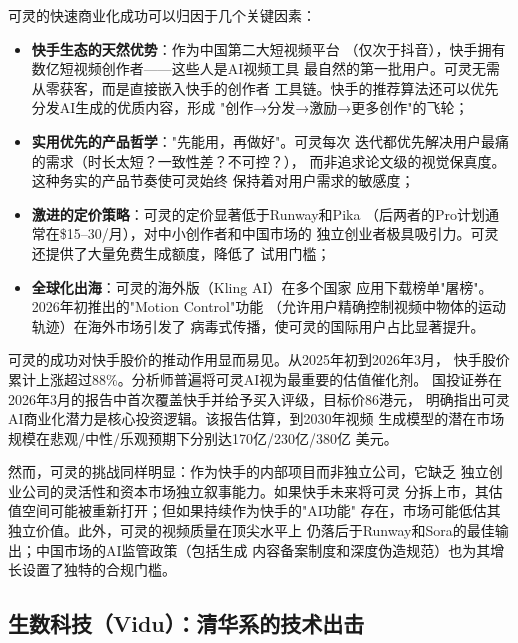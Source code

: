 \begin{whybox}[可灵为什么能在商业化上跑赢Sora和Runway？]
可灵的快速商业化成功可以归因于几个关键因素：
\begin{itemize}
  \item \textbf{快手生态的天然优势}：作为中国第二大短视频平台
    （仅次于抖音），快手拥有数亿短视频创作者——这些人是AI视频工具
    最自然的第一批用户。可灵无需从零获客，而是直接嵌入快手的创作者
    工具链。快手的推荐算法还可以优先分发AI生成的优质内容，形成
    "创作→分发→激励→更多创作"的飞轮；
  \item \textbf{实用优先的产品哲学}："先能用，再做好"。可灵每次
    迭代都优先解决用户最痛的需求（时长太短？一致性差？不可控？），
    而非追求论文级的视觉保真度。这种务实的产品节奏使可灵始终
    保持着对用户需求的敏感度；
  \item \textbf{激进的定价策略}：可灵的定价显著低于Runway和Pika
    （后两者的Pro计划通常在\$15--30/月），对中小创作者和中国市场的
    独立创业者极具吸引力。可灵还提供了大量免费生成额度，降低了
    试用门槛；
  \item \textbf{全球化出海}：可灵的海外版（Kling AI）在多个国家
    应用下载榜单"屠榜"。2026年初推出的"Motion Control"功能
    （允许用户精确控制视频中物体的运动轨迹）在海外市场引发了
    病毒式传播，使可灵的国际用户占比显著提升。
\end{itemize}
\end{whybox}

可灵的成功对快手股价的推动作用显而易见。从2025年初到2026年3月，
快手股价累计上涨超过88\%。分析师普遍将可灵AI视为最重要的估值催化剂。
国投证券在2026年3月的报告中首次覆盖快手并给予买入评级，目标价86港元，
明确指出可灵AI商业化潜力是核心投资逻辑。该报告估算，到2030年视频
生成模型的潜在市场规模在悲观/中性/乐观预期下分别达170亿/230亿/380亿
美元。

然而，可灵的挑战同样明显：作为快手的内部项目而非独立公司，它缺乏
独立创业公司的灵活性和资本市场独立叙事能力。如果快手未来将可灵
分拆上市，其估值空间可能被重新打开；但如果持续作为快手的"AI功能"
存在，市场可能低估其独立价值。此外，可灵的视频质量在顶尖水平上
仍落后于Runway和Sora的最佳输出；中国市场的AI监管政策（包括生成
内容备案制度和深度伪造规范）也为其增长设置了独特的合规门槛。

\subsection{生数科技（Vidu）：清华系的技术出击}
\label{subsec:vidu}

